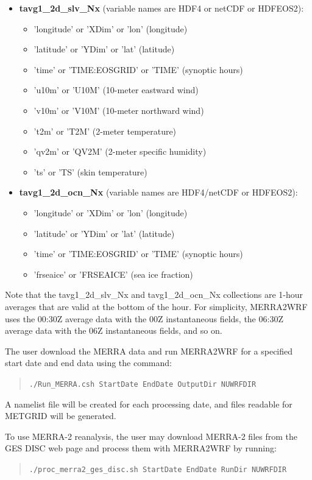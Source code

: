 \begin{itemize}
\item \textbf{tavg1\_2d\_slv\_Nx}  (variable names are HDF4 or netCDF or 
HDFEOS2):
  \begin{itemize}
  \item 'longitude' or 'XDim'  or 'lon' (longitude)
  \item 'latitude' or 'YDim' or 'lat' (latitude)
  \item 'time' or 'TIME:EOSGRID' or 'TIME' (synoptic hours)
  \item 'u10m' or 'U10M' (10-meter eastward wind)
  \item 'v10m' or 'V10M' (10-meter northward wind)
  \item 't2m' or 'T2M' (2-meter temperature)
  \item 'qv2m' or 'QV2M' (2-meter specific humidity)
  \item 'ts' or 'TS' (skin temperature)
  \end{itemize}

\item \textbf{tavg1\_2d\_ocn\_Nx} (variable names are HDF4/netCDF or HDFEOS2):
  \begin{itemize}
  \item 'longitude' or 'XDim' or 'lon' (longitude)
  \item 'latitude' or 'YDim' or 'lat' (latitude)
  \item 'time' or 'TIME:EOSGRID' or 'TIME' (synoptic hours)
  \item 'frseaice' or 'FRSEAICE' (sea ice fraction)
  \end{itemize}

\end{itemize}

Note that the tavg1\_2d\_slv\_Nx and tavg1\_2d\_ocn\_Nx collections are 1-hour 
averages that are valid at the bottom of the hour. For simplicity, MERRA2WRF
uses the 00:30Z average data with the 00Z instantaneous fields, the 06:30Z
average data with the 06Z instantaneous fields, and so on.

The user download the MERRA data and run MERRA2WRF for a specified start date
and end data using the command:
\begin{quote}
  \texttt{./Run\_MERRA.csh StartDate EndDate OutputDir NUWRFDIR}
\end{quote}
A namelist file will be created for each processing date, and files readable 
for METGRID will be generated.  

To use MERRA-2 reanalysis, the user may download MERRA-2 files from the
GES DISC web page and process them with MERRA2WRF by running:
\begin{quote}
\texttt{./proc\_merra2\_ges\_disc.sh StartDate EndDate RunDir NUWRFDIR}
\end{quote}

